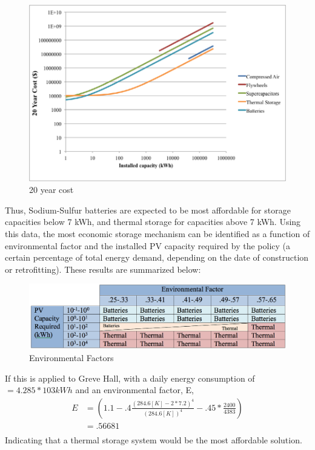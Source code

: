 \begin{figure}
\begin{center}
\includegraphics[scale=0.6]{pics/PatrickFigure5.png}
\caption{20 year cost}
\label{p5}
\end{center}
\end{figure}

Thus, Sodium-Sulfur batteries are expected to be most affordable for storage
capacities below 7 kWh, and thermal storage for capacities above 7 kWh. Using
this data, the most economic storage mechanism can be identified as a function
of environmental factor and the installed PV capacity required by the policy (a
certain percentage of total energy demand, depending on the date of
construction or retrofitting). These results are summarized below:

\begin{figure}
\begin{center}
\includegraphics[scale=0.3]{pics/PatrickTable1.png}
\caption{Environmental Factors}
\label{patrickTable1}
\end{center}
\end{figure}

If this is applied to Greve Hall, with a daily energy consumption of $=4.285*103
kWh$ and an environmental factor, E, 
\begin{equation}
\begin{aligned}
E &=(1.1-.4\frac{(284.6[K]-2*7.2)^4}{(284.6[K])^4}-.45*\frac{2400}{4383})\\
&=.56681\\
\end{aligned}
\end{equation} 
Indicating that a thermal storage system would be the most affordable solution.

